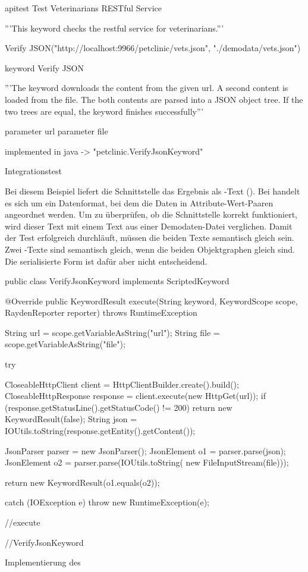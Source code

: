 \begin{program}
\begin{JavaCode}
apitest Test Veterinarians RESTful Service {
	'''This keyword checks the restful service for veterinarians.'''
	
	Verify JSON("http://localhost:9966/petclinic/vets.json", 
	            "./demodata/vets.json")
}

keyword Verify JSON {
  '''The keyword downloads the content from the given url. A second 
	   content is loaded from the file. The both contents are parsed
		 into a JSON object tree. If the two trees are equal, the 
		 keyword finishes successfully'''
		
	parameter url
	parameter file

	implemented in java -> "petclinic.VerifyJsonKeyword"
}
\end{JavaCode}
\caption{Integrationstest }
\label{prog:integrationTest}
\end{program}

\SuperPar 
Bei diesem Beispiel liefert die Schnittstelle das Ergebnis als -Text (). Bei  handelt es sich um ein Datenformat, bei dem die Daten in Attribute-Wert-Paaren angeordnet werden.  Um zu überprüfen, ob die Schnittstelle korrekt funktioniert, wird dieser Text mit einem Text aus einer Demodaten-Datei verglichen. Damit der Test erfolgreich durchläuft, müssen die beiden Texte semantisch gleich sein. Zwei -Texte sind semantisch gleich, wenn die beiden Objektgraphen gleich sind. Die serialisierte Form ist dafür aber nicht entscheidend.

\begin{program}
\begin{JavaCode}
public class VerifyJsonKeyword implements ScriptedKeyword {

  @Override
  public KeywordResult execute(String keyword, KeywordScope scope, 
	  RaydenReporter reporter) throws RuntimeException {
    String url = scope.getVariableAsString("url");
    String file = scope.getVariableAsString("file");

    try {
      CloseableHttpClient client = HttpClientBuilder.create().build();
      CloseableHttpResponse response = client.execute(new HttpGet(url));
      if (response.getStatusLine().getStatusCode() != 200) {
        return new KeywordResult(false);
      }
      String json = IOUtils.toString(response.getEntity().getContent());

      JsonParser parser = new JsonParser();
      JsonElement o1 = parser.parse(json);
      JsonElement o2 = parser.parse(IOUtils.toString(
			  new FileInputStream(file)));

      return new KeywordResult(o1.equals(o2));
    } catch (IOException e) {
      throw new RuntimeException(e);
    }
  } //execute
	
} //VerifyJsonKeyword
\end{JavaCode}
\caption{Implementierung des }
\label{prog:integrationTestImpl}
\end{program}

